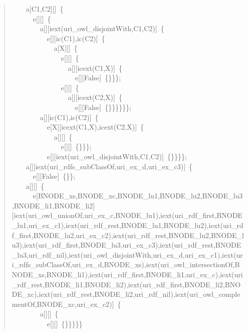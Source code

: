 \begin{quote}
{~~~~a[C1,C2][]~\{\\
~~~~~~e[][]~\{\\
~~~~~~~~a[][iext(uri\_owl\_disjointWith,C1,C2)]~\{\\
~~~~~~~~~~e[][ic(C1),ic(C2)]~\{\\
~~~~~~~~~~~~a[X][]~\{\\
~~~~~~~~~~~~~~e[][]~\{\\
~~~~~~~~~~~~~~~~a[][icext(C1,X)]~\{\\
~~~~~~~~~~~~~~~~~~e[][False]~\{\}\}\};\\
~~~~~~~~~~~~~~e[][]~\{\\
~~~~~~~~~~~~~~~~a[][icext(C2,X)]~\{\\
~~~~~~~~~~~~~~~~~~e[][False]~\{\}\}\}\}\}\};\\
~~~~~~~~a[][ic(C1),ic(C2)]~\{\\
~~~~~~~~~~e[X][icext(C1,X),icext(C2,X)]~\{\\
~~~~~~~~~~~~a[][]~\{\\
~~~~~~~~~~~~~~e[][]~\{\}\}\};\\
~~~~~~~~~~e[][iext(uri\_owl\_disjointWith,C1,C2)]~\{\}\}\}\};\\
~~~~a[][iext(uri\_rdfs\_subClassOf,uri\_ex\_d,uri\_ex\_c3)]~\{\\
~~~~~~e[][False]~\{\}\};\\
~~~~a[][]~\{\\
~~~~~~e[BNODE\_xs,BNODE\_xc,BNODE\_lu1,BNODE\_lu2,BNODE\_lu3,BNODE\_li1,BNODE\_li2][iext(uri\_owl\_unionOf,uri\_ex\_c,BNODE\_lu1),iext(uri\_rdf\_first,BNODE\_lu1,uri\_ex\_c1),iext(uri\_rdf\_rest,BNODE\_lu1,BNODE\_lu2),iext(uri\_rdf\_first,BNODE\_lu2,uri\_ex\_c2),iext(uri\_rdf\_rest,BNODE\_lu2,BNODE\_lu3),iext(uri\_rdf\_first,BNODE\_lu3,uri\_ex\_c3),iext(uri\_rdf\_rest,BNODE\_lu3,uri\_rdf\_nil),iext(uri\_owl\_disjointWith,uri\_ex\_d,uri\_ex\_c1),iext(uri\_rdfs\_subClassOf,uri\_ex\_d,BNODE\_xs),iext(uri\_owl\_intersectionOf,BNODE\_xs,BNODE\_li1),iext(uri\_rdf\_first,BNODE\_li1,uri\_ex\_c),iext(uri\_rdf\_rest,BNODE\_li1,BNODE\_li2),iext(uri\_rdf\_first,BNODE\_li2,BNODE\_xc),iext(uri\_rdf\_rest,BNODE\_li2,uri\_rdf\_nil),iext(uri\_owl\_complementOf,BNODE\_xc,uri\_ex\_c2)]~\{\\
~~~~~~~~a[][]~\{\\
~~~~~~~~~~e[][]~\{\}\}\}\}\}}
\end{quote}
